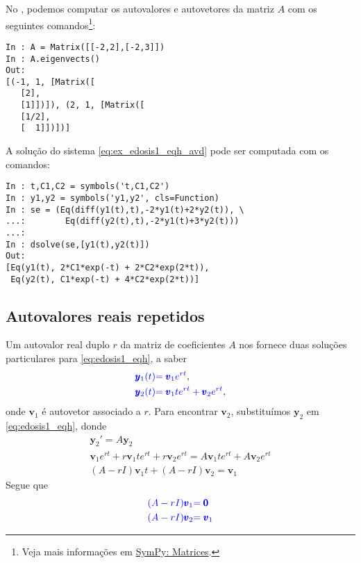 \begin{ex}
\ifispython
No \python, podemos computar os autovalores e autovetores da matriz $A$ com os seguintes comandos\footnote{Veja mais informações em \href{https://docs.sympy.org/latest/tutorial/matrices.html}{SymPy: Matrices}.}:
\begin{verbatim}
In : A = Matrix([[-2,2],[-2,3]])
In : A.eigenvects()
Out: 
[(-1, 1, [Matrix([
   [2],
   [1]])]), (2, 1, [Matrix([
   [1/2],
   [  1]])])]
\end{verbatim}

A solução do sistema \eqref{eq:ex_edosis1_eqh_avd} pode ser computada com os comandos:
\begin{verbatim}
In : t,C1,C2 = symbols('t,C1,C2')
In : y1,y2 = symbols('y1,y2', cls=Function)
In : se = (Eq(diff(y1(t),t),-2*y1(t)+2*y2(t)), \
...:        Eq(diff(y2(t),t),-2*y1(t)+3*y2(t)))
...: 
In : dsolve(se,[y1(t),y2(t)])
Out: 
[Eq(y1(t), 2*C1*exp(-t) + 2*C2*exp(2*t)),
 Eq(y2(t), C1*exp(-t) + 4*C2*exp(2*t))]
\end{verbatim}
\fi
\end{ex}

\subsection{Autovalores reais repetidos}\label{subsec:edosis1_eqh_avr}

Um autovalor real duplo $r$ da matriz de coeficientes $A$ nos fornece duas soluções particulares para \eqref{eq:edosis1_eqh}, a saber
\begin{align}
  {\color{blue}\pmb{y}_1(t)} &{\color{blue}= \pmb{v}_1e^{rt}},\\
  {\color{blue}\pmb{y}_2(t)} &{\color{blue}= \pmb{v}_1te^{rt} + \pmb{v}_2e^{rt}},
\end{align}
onde $\pmb{v}_1$ é autovetor associado a $r$. Para encontrar $\pmb{v}_2$, substituímos $\pmb{y}_2$ em \eqref{eq:edosis1_eqh}, donde
\begin{gather}
  \pmb{y}_2' = A\pmb{y}_2 \\
  \pmb{v}_1e^{rt} + r\pmb{v}_1te^{rt} + r\pmb{v}_2e^{rt} = A\pmb{v}_1te^{rt} + A\pmb{v}_2e^{rt} \\
  (A-rI)\pmb{v}_1t + (A-rI)\pmb{v}_2 = \pmb{v}_1
\end{gather}
Segue que
\begin{align}
  {\color{blue}(A-rI)\pmb{v}_1} &{\color{blue}= \pmb{0}} \\
  {\color{blue}(A-rI)\pmb{v}_2} &{\color{blue}= \pmb{v}_1}
\end{align}

